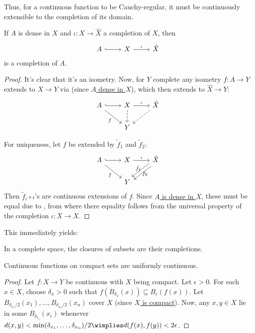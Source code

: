 	Thus, for a continuous function to be Cauchy-regular, it must be continuously extensible to the completion of its domain.
	
	\begin{cor}
		If $A$ is dense in $X$ and $\iota\colon X\to \hat X$ a completion of $X$, then
		\[
		\begin{tikzcd}
			A\ar[r, hook] & X\ar[r, "\iota"] & \hat X
		\end{tikzcd}
		\]
		is a completion of $A$.
	\end{cor}
	
	\begin{proof}
		It's clear that it's an isometry. Now, for $Y$ complete any isometry $f\colon A\to Y$ extends to $X\to Y$ via  (since \ul{$A$ dense in $X$}), which then extends to $\hat X\to Y$:
		\[
		\begin{tikzcd}
			A\ar[r, hook]\ar[dr, "f"'] & X\ar[r, "\iota"]\ar[d, dashed] & \hat X\ar[dl, dashed]\\
			& Y &
		\end{tikzcd}
		\]
		
		For uniqueness, let $f$ be extended by $\tilde f_1$ and $\tilde f_2$:
		\[
		\begin{tikzcd}
			A\ar[r, hook]\ar[dr, "f"'] & X\ar[r, "\iota"] & \hat X\ar[dl, shift left, "\tilde f_1"']\ar[dl, shift right, "f_2"]\\
			& Y &
		\end{tikzcd}
		\]
		Then $\tilde f_i\circ \iota$'s are continuous extensions of $f$. Since \ul{$A$ is dense in $X$}, these must be equal due to , from where there equality follows from the universal property of the completion $\iota\colon X\to\hat X$.
	\end{proof}
	
	\noindent This immediately yields:
	
	\begin{cor}
		In a complete space, the closures of subsets are their completions.
	\end{cor}
	
	

	\begin{prp}\label{PRP: cont funcs on compact are unif cont}
		Continuous functions on compact sets are uniformly continuous.
	\end{prp}
	
	\begin{proof}
		Let $f\colon X\to Y$ be continuous with $X$ being compact. Let $\epsilon > 0$. For each $x\in X$, choose $\delta_x > 0$ such that $f(B_{\delta_x}(x))\subseteq B_\epsilon(f(x))$.
		Let $B_{\delta_{x_1}/2}(x_1), \ldots, B_{\delta_{x_n}/2}(x_n)$ cover $X$ (since \ul{$X$ is compact}). Now, any $x, y\in X$ lie in some $B_{\delta_{x_i}}(x_i)$ whenever $d(x, y) < \min(\delta_{x_1}, \ldots, \delta_{x_n})/2\wimplies d(f(x), f(y)) < 2\epsilon$.
	\end{proof}
	
